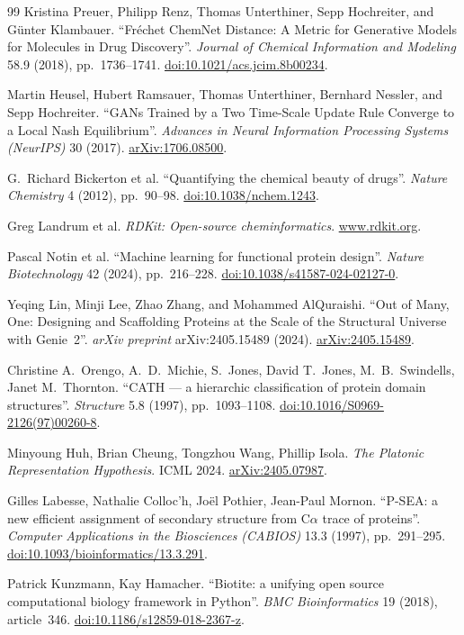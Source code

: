 \documentclass[12pt,a4paper,twoside]{report}
\begin{document}
\begin{thebibliography}{99}
Kristina Preuer, Philipp Renz, Thomas Unterthiner, Sepp Hochreiter, and G\"unter Klambauer.
``Fr\'echet ChemNet Distance: A Metric for Generative Models for Molecules in Drug Discovery''.
\textit{Journal of Chemical Information and Modeling} 58.9 (2018), pp.~1736--1741.
\href{https://doi.org/10.1021/acs.jcim.8b00234}{doi:10.1021/acs.jcim.8b00234}.

Martin Heusel, Hubert Ramsauer, Thomas Unterthiner, Bernhard Nessler, and Sepp Hochreiter.
``GANs Trained by a Two Time-Scale Update Rule Converge to a Local Nash Equilibrium''.
\textit{Advances in Neural Information Processing Systems (NeurIPS)} 30 (2017).
\href{https://arxiv.org/abs/1706.08500}{arXiv:1706.08500}.

G.~Richard Bickerton et al.
``Quantifying the chemical beauty of drugs''.
\textit{Nature Chemistry} 4 (2012), pp.~90--98.
\href{https://doi.org/10.1038/nchem.1243}{doi:10.1038/nchem.1243}.

Greg Landrum et al.
\textit{RDKit: Open-source cheminformatics}.
\href{https://www.rdkit.org}{www.rdkit.org}.

Pascal Notin et al.
``Machine learning for functional protein design''.
\textit{Nature Biotechnology} 42 (2024), pp.~216--228.
\href{https://doi.org/10.1038/s41587-024-02127-0}{doi:10.1038/s41587-024-02127-0}.

Yeqing Lin, Minji Lee, Zhao Zhang, and Mohammed AlQuraishi.
``Out of Many, One: Designing and Scaffolding Proteins at the Scale of the
Structural Universe with Genie~2''.
\textit{arXiv preprint} arXiv:2405.15489 (2024).
\href{https://arxiv.org/abs/2405.15489}{arXiv:2405.15489}.


Christine A.~Orengo, A.~D.~Michie, S.~Jones, David T.~Jones, M.~B.~Swindells, Janet M.~Thornton.
``CATH --- a hierarchic classification of protein domain structures''.
\textit{Structure} 5.8 (1997), pp.~1093--1108.
\href{https://doi.org/10.1016/S0969-2126(97)00260-8}{doi:10.1016/S0969-2126(97)00260-8}.

Minyoung Huh, Brian Cheung, Tongzhou Wang, Phillip Isola.
\textit{The Platonic Representation Hypothesis}. ICML 2024.
\href{https://arxiv.org/abs/2405.07987}{arXiv:2405.07987}.


Gilles Labesse, Nathalie Colloc'h, Jo\"el Pothier, Jean-Paul Mornon.
``P-SEA: a new efficient assignment of secondary structure from C$\alpha$ trace of proteins''.
\textit{Computer Applications in the Biosciences (CABIOS)} 13.3 (1997), pp.~291--295.
\href{https://doi.org/10.1093/bioinformatics/13.3.291}{doi:10.1093/bioinformatics/13.3.291}.

Patrick Kunzmann, Kay Hamacher.
``Biotite: a unifying open source computational biology framework in Python''.
\textit{BMC Bioinformatics} 19 (2018), article~346.
\href{https://doi.org/10.1186/s12859-018-2367-z}{doi:10.1186/s12859-018-2367-z}.

\end{thebibliography}
\end{document}
